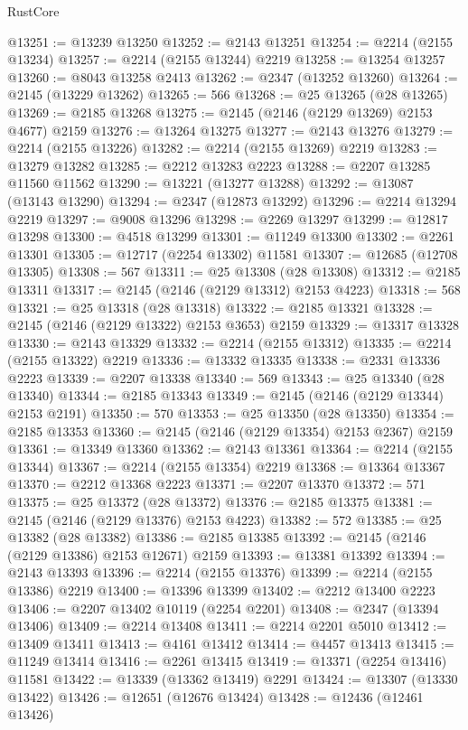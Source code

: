 \begin{lexlean}{RustCore}
\begin{coremodule}
@13251 := @13239 @13250
@13252 := @2143 @13251
@13254 := @2214 (@2155 @13234)
@13257 := @2214 (@2155 @13244) @2219
@13258 := @13254 @13257
@13260 := @8043 @13258 @2413
@13262 := @2347 (@13252 @13260)
@13264 := @2145 (@13229 @13262)
@13265 := 566
@13268 := @25 @13265 (@28 @13265)
@13269 := @2185 @13268
@13275 := @2145 (@2146 (@2129 @13269) @2153 @4677) @2159
@13276 := @13264 @13275
@13277 := @2143 @13276
@13279 := @2214 (@2155 @13226)
@13282 := @2214 (@2155 @13269) @2219
@13283 := @13279 @13282
@13285 := @2212 @13283 @2223
@13288 := @2207 @13285 @11560 @11562
@13290 := @13221 (@13277 @13288)
@13292 := @13087 (@13143 @13290)
@13294 := @2347 (@12873 @13292)
@13296 := @2214 @13294 @2219
@13297 := @9008 @13296
@13298 := @2269 @13297
@13299 := @12817 @13298
@13300 := @4518 @13299
@13301 := @11249 @13300
@13302 := @2261 @13301
@13305 := @12717 (@2254 @13302) @11581
@13307 := @12685 (@12708 @13305)
@13308 := 567
@13311 := @25 @13308 (@28 @13308)
@13312 := @2185 @13311
@13317 := @2145 (@2146 (@2129 @13312) @2153 @4223)
@13318 := 568
@13321 := @25 @13318 (@28 @13318)
@13322 := @2185 @13321
@13328 := @2145 (@2146 (@2129 @13322) @2153 @3653) @2159
@13329 := @13317 @13328
@13330 := @2143 @13329
@13332 := @2214 (@2155 @13312)
@13335 := @2214 (@2155 @13322) @2219
@13336 := @13332 @13335
@13338 := @2331 @13336 @2223
@13339 := @2207 @13338
@13340 := 569
@13343 := @25 @13340 (@28 @13340)
@13344 := @2185 @13343
@13349 := @2145 (@2146 (@2129 @13344) @2153 @2191)
@13350 := 570
@13353 := @25 @13350 (@28 @13350)
@13354 := @2185 @13353
@13360 := @2145 (@2146 (@2129 @13354) @2153 @2367) @2159
@13361 := @13349 @13360
@13362 := @2143 @13361
@13364 := @2214 (@2155 @13344)
@13367 := @2214 (@2155 @13354) @2219
@13368 := @13364 @13367
@13370 := @2212 @13368 @2223
@13371 := @2207 @13370
@13372 := 571
@13375 := @25 @13372 (@28 @13372)
@13376 := @2185 @13375
@13381 := @2145 (@2146 (@2129 @13376) @2153 @4223)
@13382 := 572
@13385 := @25 @13382 (@28 @13382)
@13386 := @2185 @13385
@13392 := @2145 (@2146 (@2129 @13386) @2153 @12671) @2159
@13393 := @13381 @13392
@13394 := @2143 @13393
@13396 := @2214 (@2155 @13376)
@13399 := @2214 (@2155 @13386) @2219
@13400 := @13396 @13399
@13402 := @2212 @13400 @2223
@13406 := @2207 @13402 @10119 (@2254 @2201)
@13408 := @2347 (@13394 @13406)
@13409 := @2214 @13408
@13411 := @2214 @2201 @5010
@13412 := @13409 @13411
@13413 := @4161 @13412
@13414 := @4457 @13413
@13415 := @11249 @13414
@13416 := @2261 @13415
@13419 := @13371 (@2254 @13416) @11581
@13422 := @13339 (@13362 @13419) @2291
@13424 := @13307 (@13330 @13422)
@13426 := @12651 (@12676 @13424)
@13428 := @12436 (@12461 @13426)

\end{coremodule}
\end{lexlean}
